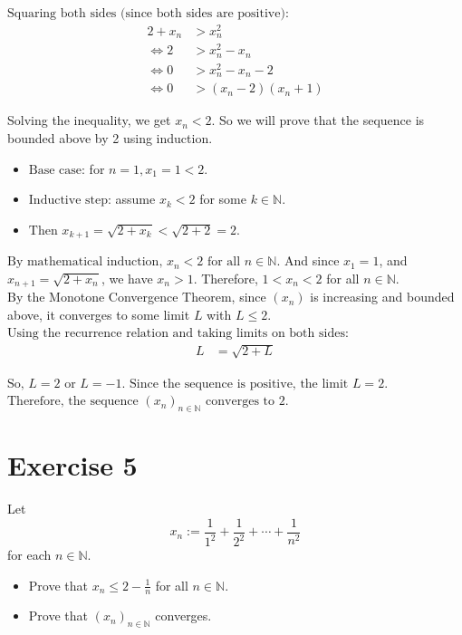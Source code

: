 \documentclass{article}
\begin{document}
$\text{Squaring both sides (since both sides are positive):}$
\begin{align*}
2 + x_n &> x_n^2 \\
\Leftrightarrow 2 &> x_n^2 - x_n \\
\Leftrightarrow 0 &> x_n^2 - x_n - 2 \\
\Leftrightarrow 0 &> (x_n - 2)(x_n + 1)
\end{align*}

Solving the inequality, we get $x_n < 2$. So we will prove that the sequence is bounded above by 2 using induction.
\begin{itemize}
    \item $\text{Base case:}$ for $n = 1, x_1 = 1 < 2.$
    \item $\text{Inductive step:}$ assume $x_k < 2$ for some $k \in \mathbb{N}.$
    \item $\text{Then } x_{k+1} = \sqrt{2 + x_k} < \sqrt{2 + 2} = 2.$
\end{itemize}

$\text{By mathematical induction, } x_n < 2 \text{ for all } n \in \mathbb{N}.$ And since $x_1 = 1$, and $x_{n+1} = \sqrt{2 + x_n}$, we have $x_n > 1$. Therefore, $1 < x_n < 2$ for all $n \in \mathbb{N}.$ \\

By the Monotone Convergence Theorem, since $(x_n)$ is increasing and bounded above, it converges to some limit $L$ with $L \leq 2.$ \\

$\text{Using the recurrence relation and taking limits on both sides:}$
\begin{align*}
    L &= \sqrt{2 + L}
\end{align*}

$\text{So, } L = 2 \text{ or } L = -1. \text{ Since the sequence is positive, the limit } L = 2.$ \\

$\text{Therefore, the sequence } (x_n)_{n \in \mathbb{N}} \text{ converges to } 2.$

\newpage

\section*{Exercise 5}
Let 
\[x_n := \frac{1}{1^2} + \frac{1}{2^2} + \cdots + \frac{1}{n^2}\]
for each $n \in \mathbb{N}$.
\begin{itemize}
\item[(a)] Prove that $x_n \leq 2-\frac{1}{n}$ for all $n \in \mathbb{N}$.
\item[(b)] Prove that $(x_n)_{n \in \mathbb{N}}$ converges.
\end{itemize}
\end{document}
